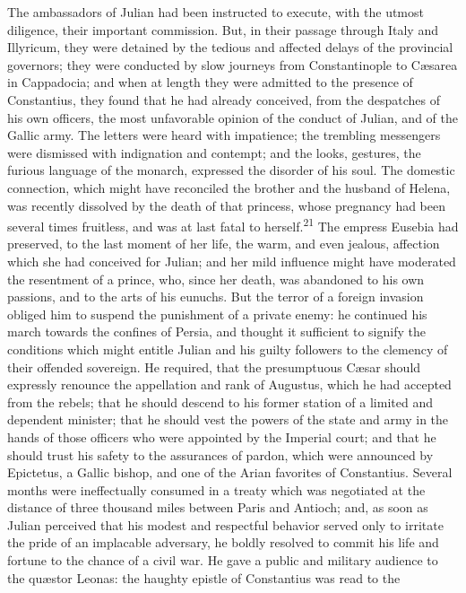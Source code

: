 The ambassadors of Julian had been instructed to execute, with
the utmost diligence, their important commission. But, in their
passage through Italy and Illyricum, they were detained by the
tedious and affected delays of the provincial governors; they
were conducted by slow journeys from Constantinople to Cæsarea in
Cappadocia; and when at length they were admitted to the presence
of Constantius, they found that he had already conceived, from
the despatches of his own officers, the most unfavorable opinion
of the conduct of Julian, and of the Gallic army. The letters
were heard with impatience; the trembling messengers were
dismissed with indignation and contempt; and the looks, gestures,
the furious language of the monarch, expressed the disorder of
his soul. The domestic connection, which might have reconciled
the brother and the husband of Helena, was recently dissolved by
the death of that princess, whose pregnancy had been several
times fruitless, and was at last fatal to herself.\textsuperscript{21} The empress
Eusebia had preserved, to the last moment of her life, the warm,
and even jealous, affection which she had conceived for Julian;
and her mild influence might have moderated the resentment of a
prince, who, since her death, was abandoned to his own passions,
and to the arts of his eunuchs. But the terror of a foreign
invasion obliged him to suspend the punishment of a private
enemy: he continued his march towards the confines of Persia, and
thought it sufficient to signify the conditions which might
entitle Julian and his guilty followers to the clemency of their
offended sovereign. He required, that the presumptuous Cæsar
should expressly renounce the appellation and rank of Augustus,
which he had accepted from the rebels; that he should descend to
his former station of a limited and dependent minister; that he
should vest the powers of the state and army in the hands of
those officers who were appointed by the Imperial court; and that
he should trust his safety to the assurances of pardon, which
were announced by Epictetus, a Gallic bishop, and one of the
Arian favorites of Constantius. Several months were ineffectually
consumed in a treaty which was negotiated at the distance of
three thousand miles between Paris and Antioch; and, as soon as
Julian perceived that his modest and respectful behavior served
only to irritate the pride of an implacable adversary, he boldly
resolved to commit his life and fortune to the chance of a civil
war. He gave a public and military audience to the quæstor
Leonas: the haughty epistle of Constantius was read to the
